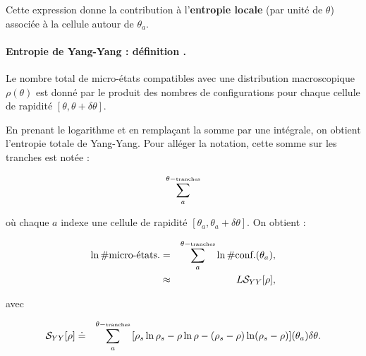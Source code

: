 Cette expression donne la contribution à l’{\bf entropie locale} (par unité de $\theta$) associée à la cellule autour de $\theta_a$.

\paragraph{Entropie de Yang-Yang : définition .}

Le nombre total de micro-états compatibles avec une distribution macroscopique $\rho(\theta)$ est donné par le produit des nombres de configurations pour chaque cellule de rapidité $[\theta, \theta + \delta \theta]$.

En prenant le logarithme et en remplaçant la somme par une intégrale, on obtient l'entropie totale de Yang-Yang. Pour alléger la notation, cette somme sur les tranches est notée :

\begin{eqnarray}
	\sum_a^{\theta-\mbox{\tiny tranches}}	
\end{eqnarray}

où chaque $a$ indexe une cellule de rapidité $[\theta_a, \theta_a + \delta\theta]$.
On obtient :

\begin{eqnarray}
    \ln \# \mbox{micro-états.} & = & \sum_a^{\theta-\mbox{\tiny tranches}} \ln \# \mbox{conf.}(\theta_a), \\
    & \approx &   L\mathcal{S}_{YY} [ \rho ] , 	
\end{eqnarray}

avec 

\begin{eqnarray}
    \mathcal{S}_{YY}[\rho] & \doteq & \sum_a^{\theta-\mbox{\tiny tranches}} \, [ \rho_s\ln \rho_s - \rho \ln \rho - ( \rho_s - \rho ) \ln ( \rho_s - \rho ) ] (\theta_a) \delta \theta .
\end{eqnarray}

